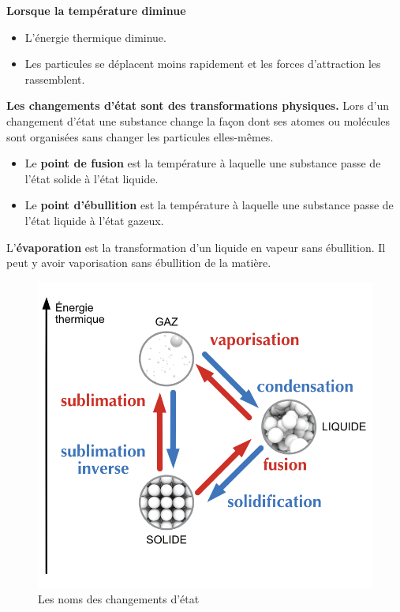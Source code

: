 \documentclass[
  11pt,
  french,
  a4paper,
  openany]{book}
\providecommand{\tightlist}{%
  \setlength{\itemsep}{0pt}\setlength{\parskip}{0pt}}
\begin{document}
\textbf{Lorsque la température diminue}

\begin{itemize}
\tightlist
\item
  L'énergie thermique diminue.
\item
  Les particules se déplacent moins rapidement et les forces d'attraction les rassemblent.
\end{itemize}

\textbf{Les changements d'état sont des transformations physiques.} Lors d'un changement d'état une substance change la façon dont ses atomes ou molécules sont organisées sans changer les particules elles-mêmes.

\begin{itemize}
\tightlist
\item
  Le \textbf{point de fusion} est la température à laquelle une substance passe de l'état solide à l'état liquide.
\item
  Le \textbf{point d'ébullition} est la température à laquelle une substance passe de l'état liquide à l'état gazeux.
\end{itemize}

L'\textbf{évaporation} est la transformation d'un liquide en vapeur sans ébullition. Il peut y avoir vaporisation sans ébullition de la matière.

\newpage

\begin{figure}

{\centering \includegraphics[width=0.45\linewidth]{images/chgt-etats} 

}

\caption{Les noms des changements d'état}\label{fig:chgt-etats}
\end{figure}
\end{document}
